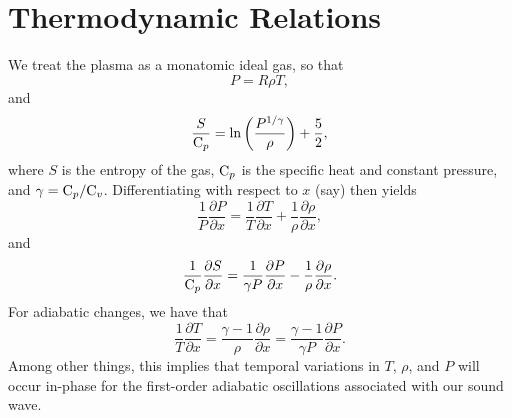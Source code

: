 \section{Thermodynamic Relations}\label{sec:thermo}
We treat the plasma as a monatomic ideal gas, so that 
\begin{equation}
P=R\rho T,
\end{equation}
and
\begin{equation}
\frac{S}{\mathrm{C}_p} = \mathrm{ln}\left(\frac{P^{1/\gamma}}{\rho} \right)+\frac{5}{2},
\end{equation}
where $S$ is the entropy of the gas, $\mathrm{C}_p$ is the specific heat and constant pressure, and $\gamma=\mathrm{C}_p/\mathrm{C}_v$.  Differentiating with respect to $x$ (say) then yields
\begin{equation}
\frac{1}{P}\frac{\partial P}{\partial x} = \frac{1}{T}\frac{\partial T}{\partial x}+\frac{1}{\rho}\frac{\partial \rho}{\partial x},
\end{equation} 
and
\begin{equation}
\frac{1}{\mathrm{C}_p}\frac{\partial S}{\partial x} = \frac{1}{\gamma P }\frac{\partial P}{\partial x} - \frac{1}{\rho}\frac{\partial \rho}{\partial x}.
\end{equation}
For adiabatic changes, we have that
\begin{equation}
\label{eq:adiabatic}
\frac{1}{T}\frac{\partial T}{\partial x} = 
\frac{\gamma-1}{\rho}\frac{\partial \rho}{\partial x} =
\frac{\gamma-1}{\gamma P}\frac{\partial P}{\partial x}.
\end{equation}
Among other things, this implies that temporal variations in $T$, $\rho$, and $P$ will occur in-phase for the first-order adiabatic oscillations associated with our sound wave.
